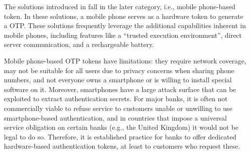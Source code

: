 






The solutions introduced in \cite{SARA22,KoganMB17,KonothFFARB20}
fall in the later category, i.e., mobile phone-based token. In these solutions, a mobile phone serves as a hardware token to generate a OTP. These solutions frequently leverage the additional capabilities inherent in mobile phones, including features like a ``trusted execution environment'', direct server communication, and a rechargeable battery. 

Mobile phone-based OTP tokens have limitations: they require network coverage, may not be suitable for all users due to privacy concerns when sharing phone numbers, and not everyone owns a smartphone or is willing to install special software on it. Moreover, smartphones have a large attack surface that can be exploited to extract authentication secrets. 
%
For major banks, it is often not commercially viable to refuse service to customers unable or unwilling to use smartphone-based authentication, and in countries that impose a universal service obligation on certain banks (e.g., the United Kingdom) it would not be legal to do so.
Therefore, it is established practice for banks to offer dedicated hardware-based authentication tokens, at least to customers who request these.

%




%







